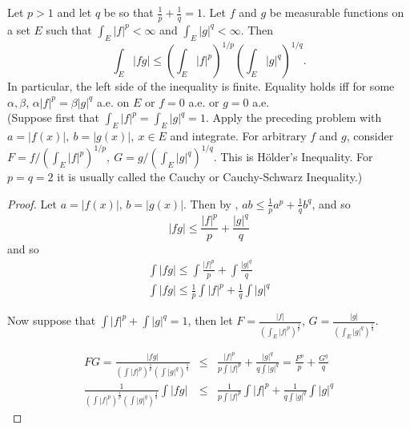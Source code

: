 \begin{pblm}%
	Let $p > 1$ and let $q$ be so that $\frac{1}{p} + \frac{1}{q} = 1$. Let $f$ and $g$ 
	be measurable functions on a set $E$ such that $\int_E |f|^p < \infty$ and 
	$\int_E|g|^q<\infty$. Then 
	\begin{equation*}
		\int_E|fg|\le\left(\int_E|f|^p\right)^{1/p}\left(\int_E|g|^q\right)^{1/q}. 
	\end{equation*}
	In particular, the left side of the inequality is finite. Equality holds iff for some $\alpha, \beta$, 
	$\alpha|f|^p = \beta|g|^q$ a.e. on $E$ or $f = 0$ a.e. or $g=0$ a.e. \\
	{\scriptsize{(Suppose first that $\int_E|f|^p = \int_E|g|^q=1$. Apply the preceding 
	problem with $a=|f(x)|,~b=|g(x)|,~x\in E$ and integrate. For arbitrary $f$ and $g$, 
	consider $F = f/(\int_E|f|^p)^{1/p},~G=g/(\int_E|g|^q)^{1/q}$. This is H\"{o}lder's 
	Inequality. For $p = q = 2$ it is usually called the Cauchy or Cauchy-Schwarz Inequality.)}}
\begin{proof}
	Let $a = |f(x)|$, $b = |g(x)|$. Then by , 
	$ab \le \frac{1}{p}a^p + \frac{1}{q}b^q$, and so 
	\begin{equation*}
		|fg| \le \frac{|f|^p}{p} + \frac{|g|^q}{q}
	\end{equation*}
	and so 
	\begin{equation*}
	\begin{array}{c}
		\int |fg| \le \int \frac{|f|^p}{p} + \int \frac{|g|^q}{q}\\
		\int |fg| \le \frac{1}{p}\int |f|^p + \frac{1}{q}\int |g|^q
	\end{array}
	\end{equation*}

	Now suppose that $\int |f|^p + \int|g|^q = 1$, then let 
	$F = \frac{|f|}{\left(\int_E|f|^p\right)^\frac{1}{p}}$, 
	$G = \frac{|g|}{\left(\int_E|g|^q\right)^\frac{1}{q}}$.  

	\begin{equation*}
	\begin{array}{rcl}
		FG  = \frac{|fg|}{\left(\int|f|^p\right)^\frac{1}{p}\left(\int|g|^q\right)^\frac{1}{q}} & \le & 
			\frac{|f|^p}{p\int|f|^p} + \frac{|g|^q}{q\int|g|^q} = \frac{F^p}{p} + \frac{G^q}{q}\\
		\frac{1}{\left(\int|f|^p\right)^\frac{1}{p}\left(\int|g|^q\right)^\frac{1}{q}}\int |fg| & \le & 
			\frac{1}{p\int|f|^p}\int|f|^p + \frac{1}{q\int|g|^q}\int |g|^q
	\end{array}
	\end{equation*}



\end{proof}
\end{pblm}
